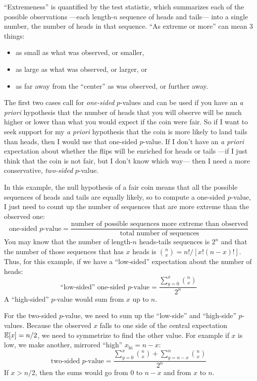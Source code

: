 ``Extremeness'' is quantified by the test statistic, which summarizes each of
the possible observations ---each length-$n$ sequence of heads and tails---
into a single number, the number of heads in that sequence. ``As extreme or
more'' can mean 3 things:
\begin{itemize}
    \item as small as what was observed, or smaller,
    \item as large as what was observed, or larger, or
    \item as far away from the ``center'' as was observed, or further away.
\end{itemize}

The first two cases call for \emph{one-sided} $p$-values and can be used if you
have an \textit{a priori} hypothesis that the number of heads that you will
observe will be much higher or lower than what you would expect if the coin
were fair. So if I want to seek support for my \textit{a priori} hypothesis
that the coin is more likely to land tails than heads, then I would use that
one-sided $p$-value. If I don't have an \textit{a priori} expectation about
whether the flips will be enriched for heads or tails ---if I just think that
the coin is not fair, but I don't know which way--- then I need a more
conservative, \emph{two-sided} $p$-value.

In this example, the null hypothesis of a fair coin means that all the possible
sequences of heads and tails are equally likely, so to compute a one-sided
$p$-value, I just need to count up the number of sequences that are more
extreme than the observed one:
\begin{equation}
    \text{one-sided $p$-value} = \frac{\text{number of possible sequences more extreme than observed}}{\text{total number of sequences}}
\end{equation}
You may know that the number of length-$n$ heads-tails sequences is $2^n$ and
that the number of those sequences that has $x$ heads is $\binom{n}{x} = n! /
\left[ x! (n-x)! \right]$. Thus, for this example, if we have a ``low-sided''
expectation about the number of heads:
\begin{equation}
    \text{``low-sided'' one-sided $p$-value} = \frac{\sum_{y=0}^x \binom{n}{x}}{2^n}
\end{equation}
A ``high-sided'' $p$-value would sum from $x$ up to $n$.

For the two-sided $p$-value, we need to sum up the ``low-side'' and ``high-side'' $p$-values. Because the observed $x$ falls to one side of the central expectation $\mathbb{E}\!\left[{x}\right] = n/2$, we need to symmetrize to find the other value. For example if $x$ is low, we make another, mirrored ``high'' $x_\mathrm{hi} = n-x$:
\begin{equation}
    \text{two-sided $p$-value} = \frac{\sum_{y=0}^x \binom{n}{x} + \sum_{y=n-x}^n \binom{n}{x}}{2^n}
\end{equation}
If $x > n/2$, then the sums would go from $0$ to $n-x$ and from $x$ to $n$.


